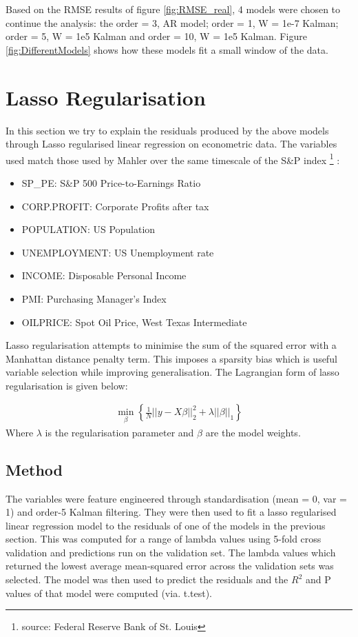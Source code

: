 \documentclass{sig-alternate-05-2015}
\begin{document}
Based on the RMSE results of figure \ref{fig:RMSE_real}, 4 models were chosen to continue the analysis: the order = 3, AR model; order = 1, W = 1e-7 Kalman; order = 5, W = 1e5 Kalman and order = 10, W = 1e5 Kalman. Figure \ref{fig:DifferentModels} shows how these models fit a small window of the data.   

\clearpage
\section{Lasso Regularisation}
In this section we try to explain the residuals produced by the above models through Lasso regularised linear regression on econometric data. The variables used match those used by Mahler over the same timescale of the S\&P index \footnote{source: Federal Reserve Bank of St. Louis} \cite{mahler2009modeling}: 
\begin{itemize}
\item SP\_PE: S\&P 500 Price-to-Earnings Ratio 
\item CORP.PROFIT: Corporate Profits after tax
\item POPULATION: US Population
\item UNEMPLOYMENT: US Unemployment rate
\item INCOME: Disposable Personal Income
\item PMI: Purchasing Manager's Index
\item OILPRICE: Spot Oil Price, West Texas Intermediate
\end{itemize}

Lasso regularisation attempts to minimise the sum of the squared error with a Manhattan distance penalty term. This imposes a sparsity bias which is useful variable selection while improving generalisation. The Lagrangian form of lasso regularisation is given below:

\begin{align}
\min_\beta\left\lbrace\frac{1}{N} ||y - X\beta||^2_2 + \lambda||\beta||_1\right\rbrace
\end{align}
Where $\lambda$ is the regularisation parameter and $\beta$ are the model weights. 

\subsection{Method} 
The variables were feature engineered through standardisation (mean = 0, var = 1) and order-5 Kalman filtering. They were then used to fit a lasso regularised linear regression model to the residuals of one of the models in the previous section. This was computed for a range of lambda values using 5-fold cross validation and predictions run on the validation set. The lambda values which returned the lowest average mean-squared error across the validation sets was selected. The model was then used to predict the residuals and the $R^2$ and P values of that model were computed (via. t.test). 
\end{document}
